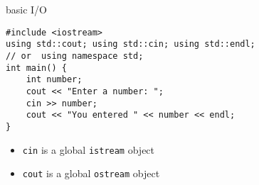 \begin{frame}[fragile,label=basicIO]{basic I/O}
\lstset{language=C++,style=small}
\begin{lstlisting}
#include <iostream>
using std::cout; using std::cin; using std::endl;
// or  using namespace std;
int main() {
    int number;
    cout << "Enter a number: ";
    cin >> number;
    cout << "You entered " << number << endl;
}
\end{lstlisting}
\begin{itemize}
\item<2-> {\tt cin} is a global {\tt istream} object
\item<2-> {\tt cout} is a global {\tt ostream} object
\end{itemize}
\end{frame}

